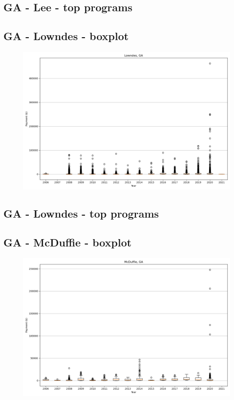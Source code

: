 \subsection*{GA - Lee - top programs}

\newpage
\subsection*{GA - Lowndes - boxplot}
\begin{figure}[h]
\centering
\includegraphics[width=7in]{../output/boxplots/counties/Lowndes-GA_boxplot.png}
\end{figure}


\subsection*{GA - Lowndes - top programs}

\newpage
\subsection*{GA - McDuffie - boxplot}
\begin{figure}[h]
\centering
\includegraphics[width=7in]{../output/boxplots/counties/McDuffie-GA_boxplot.png}
\end{figure}


